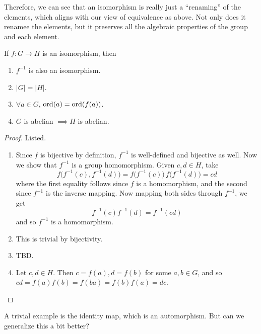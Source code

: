   Therefore, we can see that an isomorphism is really just a ``renaming'' of the elements, which aligns with our view of equivalence as above. Not only does it renamee the elements, but it preserves all the algebraic properties of the group and each element. 

  \begin{theorem}
    If $f: G \rightarrow H$ is an isomorphism, then 
    \begin{enumerate}
      \item $f^{-1}$ is also an isomorphism. 
      \item $|G| = |H|$.
      \item $\forall a \in G$, $\ord(a) = \ord(f(a))$. 
      \item $G$ is abelian $\implies H$ is abelian. 
    \end{enumerate} 
  \end{theorem}
  \begin{proof}
    Listed. 
    \begin{enumerate}
      \item Since $f$ is bijective by definition, $f^{-1}$ is well-defined and bijective as well. Now we show that $f^{-1}$ is a group homomorphism. Given $c, d \in H$, take 
      \begin{equation}
        f \big( f^{-1} (c), f^{-1} (d)\big) = f \big( f^{-1} (c) \big) \, f \big( f^{-1} (d) \big) = cd 
      \end{equation}
      where the first equality follows since $f$ is a homomorphism, and the second since $f^{-1}$ is the inverse mapping. Now mapping both sides through $f^{-1}$, we get 
      \begin{equation}
        f^{-1} (c) f^{-1} (d) = f^{-1} (cd)
      \end{equation}
      and so $f^{-1}$ is a homomorphism. 

      \item This is trivial by bijectivity. 
      \item TBD. 
      \item Let $c, d \in H$. Then $c = f(a), d = f(b)$ for some $a, b \in G$, and so $cd = f(a) f(b) = f(ba) = f(b) f(a) = dc$. 
    \end{enumerate}
  \end{proof}

  A trivial example is the identity map, which is an automorphism. But can we generalize this a bit better? 


